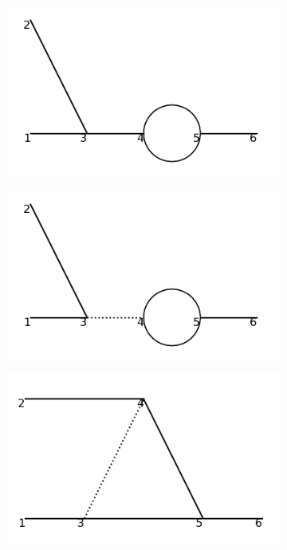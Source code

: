 \documentclass[11pt,a4paper,twoside,pdf]{article}
\numberwithin{equation}{section}
\begin{document}
\begin{figure}[h!]
    \hfill
    \begin{subfigure}[t]{0.24\textwidth}
        \centering
        \includegraphics[width=\textwidth]{plots/order3/order3_1to2/3.png}
        \caption{ }
    \end{subfigure}
    \hfill
    \begin{subfigure}[t]{0.24\textwidth}
        \centering
        \includegraphics[width=\textwidth]{plots/order3/order3_1to2/4.png}
        \caption{ }
    \end{subfigure}
    \hfill
    \begin{subfigure}[t]{0.24\textwidth}
        \centering
        \includegraphics[width=\textwidth]{plots/order3/order3_1to2/5.png}

\end{subfigure}
\end{figure}
\end{document}
